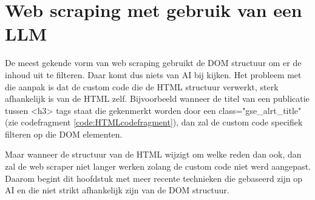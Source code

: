\section{Web scraping met gebruik van een LLM }
De meest gekende vorm van web scraping gebruikt de DOM structuur om er de inhoud uit te filteren. Daar komt dus niets van AI bij kijken. Het probleem met die aanpak is dat de custom code die de HTML structuur verwerkt, sterk afhankelijk is van de HTML zelf. Bijvoorbeeld wanneer de titel van een publicatie tussen <h3> tags staat die gekenmerkt worden door een class="gse\_alrt\_title" (zie codefragment \ref{code:HTMLcodefragment}), dan zal de custom code specifiek filteren op die DOM elementen.
Maar wanneer de structuur van de HTML wijzigt om welke reden dan ook, dan zal de web scraper niet langer werken zolang de custom code niet werd aangepast.\\
Daarom begint dit hoofdstuk met meer recente technieken die gebaseerd zijn op AI en die niet strikt afhankelijk zijn van de DOM structuur.
